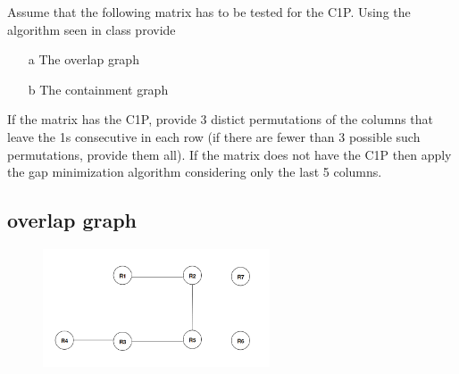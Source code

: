 \documentclass[]{article}
\begin{document}
Assume that the following matrix has to be tested for the C1P. Using the algorithm seen in class provide 
\begin{enumerate}

\item[a] The overlap graph
\item[b] The containment graph

\end{enumerate}

If the matrix has the C1P, provide 3 distict permutations of the columns that leave the 1s consecutive
in each row (if there are fewer than 3 possible such permutations, provide them all). If the matrix does not have the C1P then apply the gap minimization algorithm considering only the last 5 columns.

%
%
%
%
%
%

%
%

\subsection{overlap graph}

\begin{figure}[H]
	\begin{center}
		\includegraphics[width=0.6\textwidth]{overlap_graph.png}
	\end{center}
\end{figure}
\end{document}
